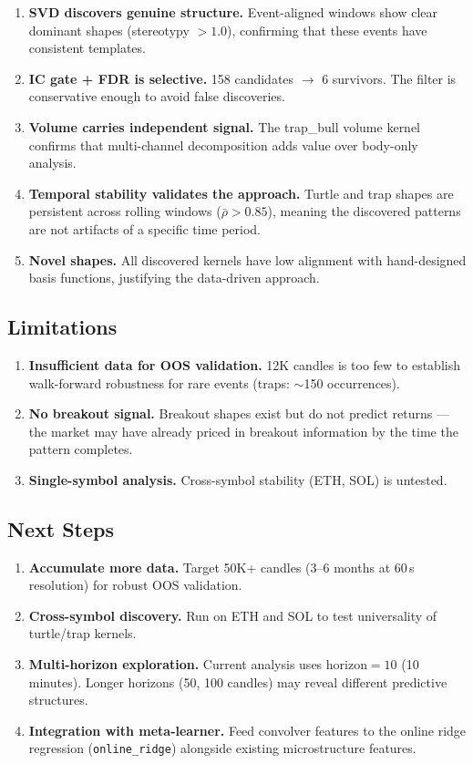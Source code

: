 \documentclass[11pt,a4paper]{article}
\begin{document}
\begin{enumerate}
\item \textbf{SVD discovers genuine structure.}  Event-aligned windows show
      clear dominant shapes (stereotypy $> 1.0$), confirming that these events
      have consistent templates.
\item \textbf{IC gate + FDR is selective.}  158 candidates $\to$ 6 survivors.
      The filter is conservative enough to avoid false discoveries.
\item \textbf{Volume carries independent signal.}  The trap\_bull volume kernel
      confirms that multi-channel decomposition adds value over body-only
      analysis.
\item \textbf{Temporal stability validates the approach.}  Turtle and trap
      shapes are persistent across rolling windows ($\bar{\rho} > 0.85$),
      meaning the discovered patterns are not artifacts of a specific time
      period.
\item \textbf{Novel shapes.}  All discovered kernels have low alignment with
      hand-designed basis functions, justifying the data-driven approach.
\end{enumerate}

\subsection{Limitations}

\begin{enumerate}
\item \textbf{Insufficient data for OOS validation.}  12K candles is too few to
      establish walk-forward robustness for rare events (traps:
      $\sim$150 occurrences).
\item \textbf{No breakout signal.}  Breakout shapes exist but do not predict
      returns --- the market may have already priced in breakout information by
      the time the pattern completes.
\item \textbf{Single-symbol analysis.}  Cross-symbol stability (ETH, SOL) is
      untested.
\end{enumerate}

\subsection{Next Steps}

\begin{enumerate}
\item \textbf{Accumulate more data.}  Target 50K+ candles (3--6 months at 60\,s
      resolution) for robust OOS validation.
\item \textbf{Cross-symbol discovery.}  Run on ETH and SOL to test universality
      of turtle/trap kernels.
\item \textbf{Multi-horizon exploration.}  Current analysis uses horizon${}=10$
      (10 minutes).  Longer horizons (50, 100 candles) may reveal different
      predictive structures.
\item \textbf{Integration with meta-learner.}  Feed convolver features to the
      online ridge regression (\texttt{online\_ridge}) alongside existing
      microstructure features.
\end{enumerate}
\end{document}

